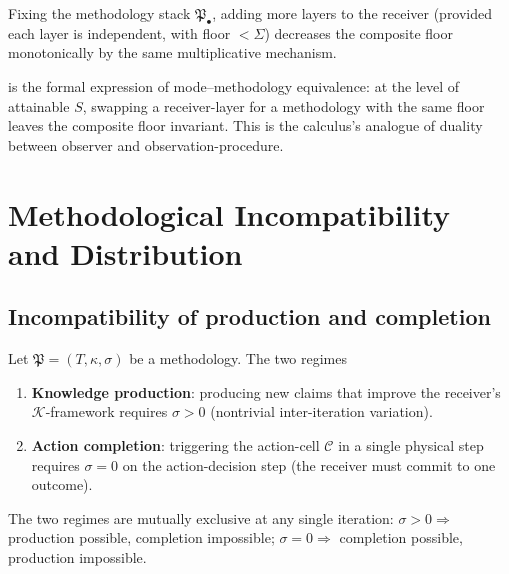 \documentclass[twocolumn,11pt,a4paper]{article}
\newcommand{\K}{\mathcal{K}}
\newcommand{\Cell}{\mathcal{C}}
\newcommand{\Method}{\mathfrak{P}}
\newcommand{\receiver}{\mathsf{R}}
\begin{document}
\begin{corollary}\label{cor:receiver-only}
Fixing the methodology stack $\Method_\bullet$, adding more layers to the
receiver (provided each layer is independent, with floor $<\Sigma$)
decreases the composite floor monotonically by the same multiplicative
mechanism.
\end{corollary}

\begin{remark}[Symmetry in $\receiver$ and $\Method$]\label{rem:symmetry}
 is the formal expression of mode--methodology
equivalence: at the level of attainable $S$, swapping a receiver-layer
for a methodology with the same floor leaves the composite floor invariant.
This is the calculus's analogue of duality between observer and
observation-procedure.
\end{remark}

\section{Methodological Incompatibility and Distribution}
\label{sec:incompatibility}

\subsection{Incompatibility of production and completion}

\begin{theorem}
\label{thm:incompat}
Let $\Method=(T,\kappa,\sigma)$ be a methodology. The two regimes
\begin{enumerate}[label=(\Roman*),leftmargin=*]
\item \textbf{Knowledge production}: producing new claims that improve
the receiver's $\K$-framework requires $\sigma>0$ (nontrivial
inter-iteration variation).
\item \textbf{Action completion}: triggering the action-cell $\Cell$ in a
single physical step requires $\sigma=0$ on the action-decision step
(the receiver must commit to one outcome).
\end{enumerate}
The two regimes are mutually exclusive at any single iteration:
$\sigma>0\Rightarrow$ production possible, completion impossible;
$\sigma=0\Rightarrow$ completion possible, production impossible.
\end{theorem}
\end{document}
